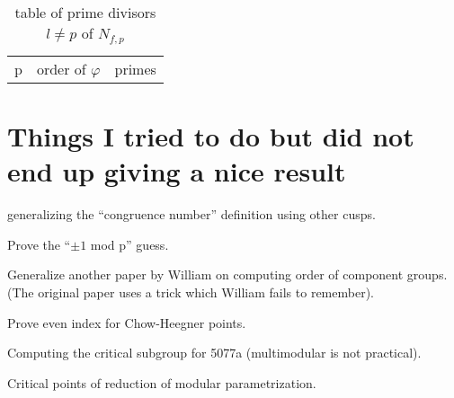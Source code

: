 \documentclass [11pt, proquest] {uwthesis}[2015/03/03]
\begin{document}
\begin{table}
\caption{table of prime divisors $l \neq p$ of $N_{f,p}$}
\begin{tabular}{c|c|c}
p & order of $\varphi$ & primes  \\
\end{tabular}
\end{table}

\chapter{Things I tried to do but did not end up giving a nice result}

generalizing the ``congruence number'' definition using other cusps.  

Prove the ``$\pm 1$ mod p'' guess. 

Generalize another paper by William on computing order of component groups. (The original paper uses a trick which 
William fails to remember). 

Prove even index for Chow-Heegner points. 

Computing the critical subgroup for 5077a (multimodular is not practical). 

Critical points of reduction of modular parametrization. 


\nocite{*}


\end{document}
